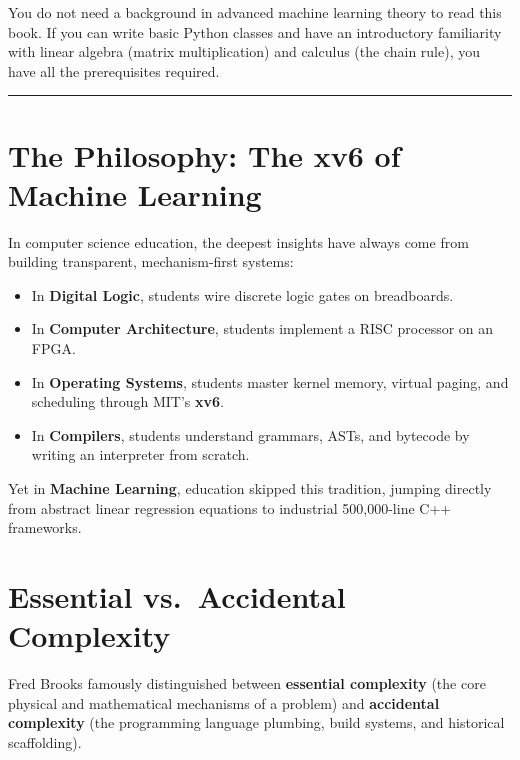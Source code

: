 \documentclass[
  letterpaper,
]{scrbook}
\providecommand{\tightlist}{%
  \setlength{\itemsep}{0pt}\setlength{\parskip}{0pt}}
\begin{document}
You do not need a background in advanced machine learning theory to read
this book. If you can write basic Python classes and have an
introductory familiarity with linear algebra (matrix multiplication) and
calculus (the chain rule), you have all the prerequisites required.

\begin{center}\rule{0.5\linewidth}{0.5pt}\end{center}

\section*{The Philosophy: The xv6 of Machine
Learning}\label{the-philosophy-the-xv6-of-machine-learning}


In computer science education, the deepest insights have always come
from building transparent, mechanism-first systems:

\begin{itemize}
\tightlist
\item
  In \textbf{Digital Logic}, students wire discrete logic gates on
  breadboards.
\item
  In \textbf{Computer Architecture}, students implement a RISC processor
  on an FPGA.
\item
  In \textbf{Operating Systems}, students master kernel memory, virtual
  paging, and scheduling through MIT's \textbf{xv6}.
\item
  In \textbf{Compilers}, students understand grammars, ASTs, and
  bytecode by writing an interpreter from scratch.
\end{itemize}

Yet in \textbf{Machine Learning}, education skipped this tradition,
jumping directly from abstract linear regression equations to industrial
500,000-line C++ frameworks.

\section*{Essential vs.~Accidental
Complexity}\label{essential-vs.-accidental-complexity}


Fred Brooks famously distinguished between \textbf{essential complexity}
(the core physical and mathematical mechanisms of a problem) and
\textbf{accidental complexity} (the programming language plumbing, build
systems, and historical scaffolding).
\end{document}
